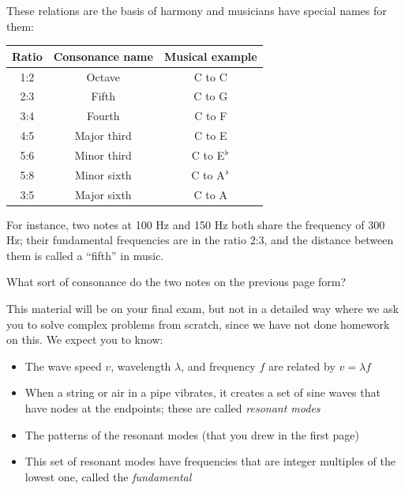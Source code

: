 \documentclass[12pt]{article}
\begin{document}
These relations are the basis of harmony and musicians have special names for them:
\begin{center}
\large
	\begin{tabular}{|c|c|c|}
		\hline
		\bf Ratio & \bf Consonance name & \bf Musical example \\ \hline
		1:2   & Octave          & C to C          \\ \hline
		2:3   & Fifth           & C to G          \\ \hline
		3:4   & Fourth          & C to F          \\ \hline
		4:5   & Major third     & C to E          \\ \hline
		5:6   & Minor third     & C to E$\null^\flat$     \\ \hline
		5:8   & Minor sixth     & C to A$\null^\flat$     \\ \hline
		3:5   & Major sixth     & C to A          \\ \hline
	\end{tabular}

\normalsize
\end{center}
For instance, two notes at 100 Hz and 150 Hz both share the frequency of 300 Hz; their fundamental frequencies are in the ratio 2:3, and the distance between them is called a ``fifth'' in music.

What sort of consonance do the two notes on the previous page form? 

\vfill




\begin{center}
	
	\underline{\hspace{3in}}
	
	\vspace{1in}
	
	This material will be on your final exam, but not in a detailed way where we ask you to solve complex problems from scratch, since we have not done homework on this. We expect you to know:
	
	\begin{itemize}
		\item The wave speed $v$, wavelength $\lambda$, and frequency $f$ are related by $v = \lambda f$
		\item When a string or air in a pipe vibrates, it creates a set of sine waves that have nodes at the endpoints; these are called {\it resonant modes}
		\item The patterns of the resonant modes (that you drew in the first page)
		\item This set of resonant modes have frequencies that are integer multiples of the lowest one, called the {\it fundamental}

	\end{itemize}
\end{center}

 
\end{document}
